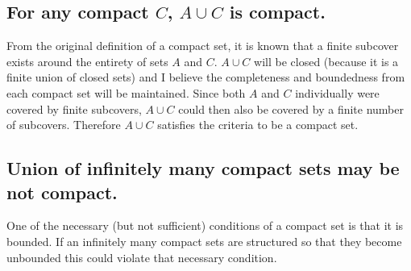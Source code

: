 \documentclass[]{article}
\begin{document}
\subsection{For any compact $C$, $A \cup C$ is compact.}
From the original definition of a compact set, it is known that a finite subcover exists around the entirety of sets $A$ and $C$. 
$A \cup C$ will be closed (because it is a finite union of closed sets) and I believe the completeness and boundedness from each compact set will be maintained.
Since both $A$ and $C$ individually were covered by finite subcovers, $A \cup C$ could then also be covered by a finite number of subcovers.
Therefore $A \cup C$ satisfies the criteria to be a compact set.

\subsection{Union of infinitely many compact sets may be not compact.}
One of the necessary (but not sufficient) conditions of a compact set is that it is bounded. If an infinitely many compact sets are structured so that they become unbounded this could violate that necessary condition.
\end{document}
